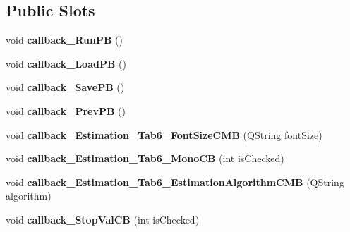 \subsection*{Public Slots}
\begin{DoxyCompactItemize}
\item 
void {\bfseries callback\+\_\+\+Run\+PB} ()\hypertarget{classnmf_estimation___tab6_a3c5c8d50cc3593a54eb40c0c20fc585f}{}\label{classnmf_estimation___tab6_a3c5c8d50cc3593a54eb40c0c20fc585f}

\item 
void {\bfseries callback\+\_\+\+Load\+PB} ()\hypertarget{classnmf_estimation___tab6_ad8a9fc985e4a246cc57bbc1a0a30df77}{}\label{classnmf_estimation___tab6_ad8a9fc985e4a246cc57bbc1a0a30df77}

\item 
void {\bfseries callback\+\_\+\+Save\+PB} ()\hypertarget{classnmf_estimation___tab6_ab9d8966d571adcbf20eb563be2cee41f}{}\label{classnmf_estimation___tab6_ab9d8966d571adcbf20eb563be2cee41f}

\item 
void {\bfseries callback\+\_\+\+Prev\+PB} ()\hypertarget{classnmf_estimation___tab6_ad196ce3ba2a85c4184d2c2b53d011910}{}\label{classnmf_estimation___tab6_ad196ce3ba2a85c4184d2c2b53d011910}

\item 
void {\bfseries callback\+\_\+\+Estimation\+\_\+\+Tab6\+\_\+\+Font\+Size\+C\+MB} (Q\+String font\+Size)\hypertarget{classnmf_estimation___tab6_a58990cfc44584846cb25658883373cc7}{}\label{classnmf_estimation___tab6_a58990cfc44584846cb25658883373cc7}

\item 
void {\bfseries callback\+\_\+\+Estimation\+\_\+\+Tab6\+\_\+\+Mono\+CB} (int is\+Checked)\hypertarget{classnmf_estimation___tab6_af259a50d0e330514fbb7a5c1217c4877}{}\label{classnmf_estimation___tab6_af259a50d0e330514fbb7a5c1217c4877}

\item 
void {\bfseries callback\+\_\+\+Estimation\+\_\+\+Tab6\+\_\+\+Estimation\+Algorithm\+C\+MB} (Q\+String algorithm)\hypertarget{classnmf_estimation___tab6_a8b26cccc0e75bcc4fedba2b7ef4c3e20}{}\label{classnmf_estimation___tab6_a8b26cccc0e75bcc4fedba2b7ef4c3e20}

\item 
void {\bfseries callback\+\_\+\+Stop\+Val\+CB} (int is\+Checked)\hypertarget{classnmf_estimation___tab6_aeee2c7be131477d6efda0226dad88ab6}{}\label{classnmf_estimation___tab6_aeee2c7be131477d6efda0226dad88ab6}


\end{DoxyCompactItemize}
